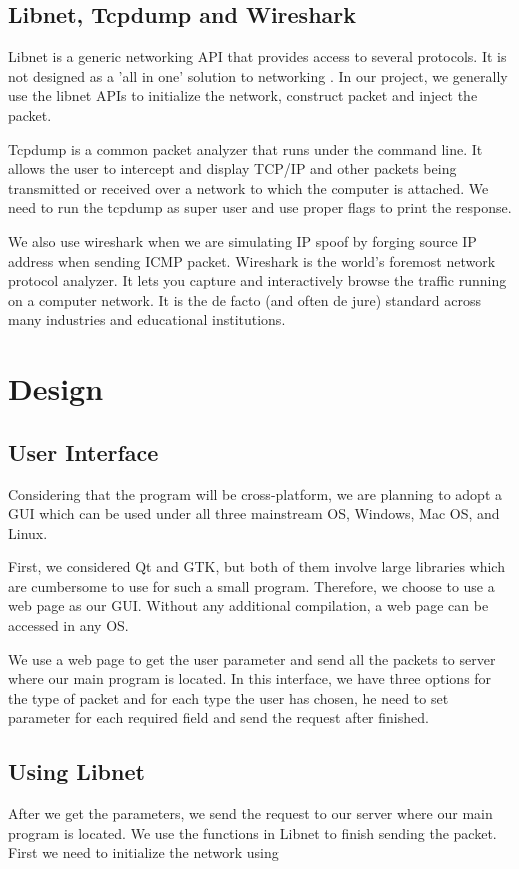 \documentclass[12pt,letterpaper]{report}
\begin{document}
\section*{Libnet, Tcpdump and Wireshark}
Libnet is a generic networking API that provides access to 
several protocols. It is not designed as a 'all in one' solution 
to networking \cite{5}. In our project, we generally use the 
libnet APIs to initialize the network, construct packet and 
inject the packet.

Tcpdump is a common packet analyzer that runs under the 
command line. It allows the user to intercept and display 
TCP/IP and other packets being transmitted or received 
over a network to which the computer is attached\cite{6}. 
We need to run the tcpdump as super user and use 
proper flags to print the response. 

We also use wireshark\cite{7} when we are simulating IP 
spoof  by forging source IP address when sending ICMP 
packet. Wireshark is the world's foremost network protocol 
analyzer. It lets you capture and interactively browse the 
traffic running on a computer network. It is the de facto 
(and often de jure) standard across many industries and 
educational institutions.

\chapter*{Design}

\section*{User Interface}
Considering that the program will be cross-platform, we 
are planning to adopt a GUI which can be used under all
three mainstream OS, Windows, Mac OS, and Linux.

First, we considered Qt and GTK, but both of them involve
large libraries which are cumbersome to use for such a
small program. Therefore, we choose to use a web page
as our GUI. Without any additional compilation, a web page
can be accessed in any OS.

We use a web page to get the user parameter and send all 
the packets to server where our main program is located.
 In this interface, we have three options for the type of 
 packet and for each type the user has chosen, he need 
 to set parameter for each required field and send the 
 request after finished.
 
 \section*{Using Libnet}
 After we get the parameters, we send the request to 
 our server where our main program is located. We use 
 the functions in Libnet to finish sending the packet. 
 First we need to initialize the network using 
 
\end{document}
